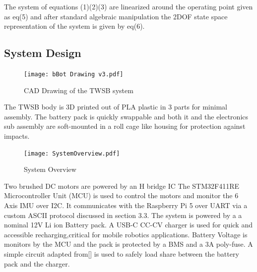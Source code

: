     The system of equations (1)(2)(3) are linearized around the operating point given as eq(5) and after standard algebraic manipulation the 
    2DOF state space representation of the system is given by eq(6).
   
    \pagebreak{}

    \subsection{System Design}
        \begin{figure}[H]
            \texttt{[image: bBot Drawing v3.pdf]}
            \caption{CAD Drawing of the TWSB system}
        \end{figure}

        The TWSB body is 3D printed out of PLA plastic in 3 parts for minimal assembly.
        The battery pack is quickly swappable and both it and the electronics sub assembly 
        are soft-mounted in a roll cage like housing for protection against impacts. 
        \begin{figure}[H]
            \texttt{[image: SystemOverview.pdf]}
            \caption{System Overview}
        \end{figure}

        Two brushed DC motors are powered by an H bridge IC 
        The STM32F411RE Microcontroller Unit (MCU) is used to control the 
        motors and monitor the 6 Axis IMU over I2C. It communicates with the 
        Raspberry Pi 5 over UART via a custom ASCII protocol discussed in section 3.3. 
        The system is powered by a a nominal 12V Li ion Battery pack. A USB-C CC-CV charger is used for quick 
        and accessible recharging,critical for mobile robotics applications. Battery Voltage is monitors by the MCU
        and the pack is protected by a BMS and a 3A poly-fuse.
        A simple circuit adapted from[] is used to safely load share between the battery pack and the charger.


        \pagebreak{}
